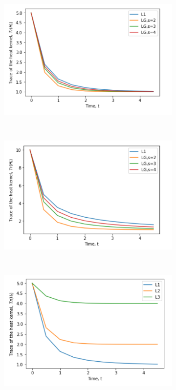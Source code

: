 \documentclass[10pt,a4paper]{article}
\begin{document}
		\begin{figure}[H]
			\centering
			\begin{subfigure}[b]{0.45\textwidth}
				\includegraphics[width= \textwidth]{images/model-1-mellin.png}
				\caption{}
				\label{model1-mellin}
			\end{subfigure}~
			\begin{subfigure}[b]{0.45\textwidth}
				\includegraphics[width= \textwidth]{images/model-2-mellin.png}
				\caption{}
				\label{model2-mellin}
			\end{subfigure} \\
		    \begin{subfigure}[b]{0.45\textwidth}
		    	\includegraphics[width= \textwidth]{images/model-1-klap.png}

\end{subfigure}
\end{figure}
\end{document}

